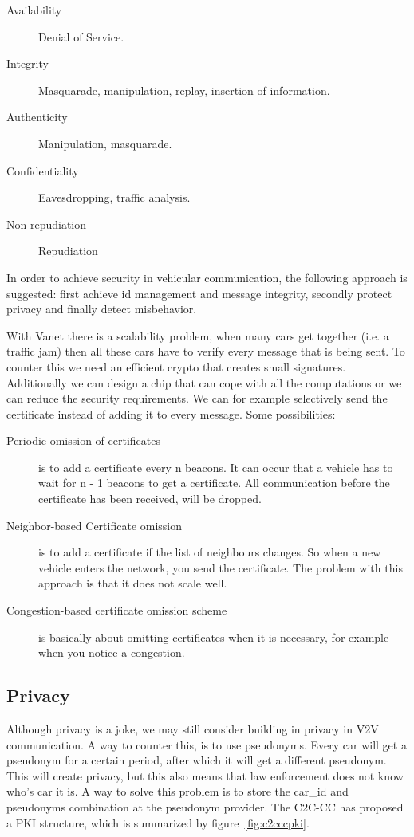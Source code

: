 \documentclass{article}
\begin{document}
\begin{description}
\item[Availability] Denial of Service.
\item[Integrity] Masquarade, manipulation, replay, insertion of information.
\item[Authenticity] Manipulation, masquarade.
\item[Confidentiality] Eavesdropping, traffic analysis.
\item[Non-repudiation] Repudiation
\end{description}

In order to achieve security in vehicular communication, the following approach is suggested: first achieve id management and message integrity, secondly protect privacy and finally detect misbehavior.

With Vanet there is a scalability problem, when many cars get together (i.e. a traffic jam) then all these cars have to verify every message that is being sent. To counter this we need an efficient crypto that creates small signatures. Additionally we can design a chip that can cope with all the computations or we can reduce the security requirements. We can for example selectively send the certificate instead of adding it to every message. Some possibilities:

\begin{description}
\item[Periodic omission of certificates] is to add a certificate every n beacons. It can occur that a vehicle has to wait for n - 1 beacons to get a certificate. All communication before the certificate has been received, will be dropped.
\item[Neighbor-based Certificate omission] is to add a certificate if the list of neighbours changes. So when a new vehicle enters the network, you send the certificate. The problem with this approach is that it does not scale well.
\item[Congestion-based certificate omission scheme] is basically about omitting certificates when it is necessary, for example when you notice a congestion.
\end{description}

\subsection*{Privacy}

Although privacy is a joke, we may still consider building in privacy in V2V communication. A way to counter this, is to use pseudonyms. Every car will get a pseudonym for a certain period, after which it will get a different pseudonym. This will create privacy, but this also means that law enforcement does not know who's car it is. A way to solve this problem is to store the car\_id and pseudonyms combination at the pseudonym provider. The C2C-CC has proposed a PKI structure, which is summarized by figure~\ref{fig:c2cccpki}.
\end{document}
